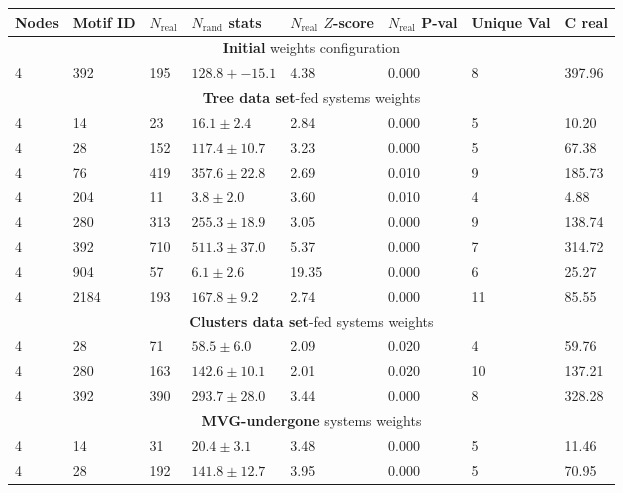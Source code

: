 \documentclass[a4paper,12pt]{article}
\begin{document}
\begin{table}[h!]
	\begin{center}
		\begin{tabular}{||p{1cm} | p{1cm} | p{1cm} | p{2.5cm} | p{1.5cm} | p{1.5cm} | p{1cm} | p{1.5cm}||}			
			\hline
			Nodes & Motif ID & $N_{\text{real}}$ & $N_{\text{rand}}$ stats & $N_{\text{real}}$ $Z$-score &  $N_{\text{real}}$ P-val & Unique Val & C real \\
			\hline \hline
			\multicolumn{8}{c}{\textbf{Initial} weights configuration} \\
			\hline
			4 & 392 & 195 & $ 128.8+-15.1 $ & 4.38  & 0.000 & 8 & 397.96 \\
			\hline \hline
			\multicolumn{8}{c}{\textbf{Tree data set}-fed systems weights} \\
			\hline
			4 & 14    & 23     & $  16.1\pm2.4      $ &  2.84  & 0.000  & 5  &  10.20   \\
			4 & 28    & 152    & $   117.4\pm10.7   $ &  3.23  & 0.000  & 5  &  67.38   \\
			4 & 76    & 419    & $   357.6\pm22.8   $ &  2.69  & 0.010  & 9  &  185.73  \\
			4 & 204   &  11    & $   3.8\pm2.0      $ &  3.60  & 0.010  & 4  &  4.88    \\
			4 & 280   &  313   & $     255.3\pm18.9 $ &  3.05  & 0.000  & 9  &  138.74  \\
			4 & 392   &  710   & $     511.3\pm37.0 $ &  5.37  & 0.000  & 7  &  314.72  \\
			4 & 904   &  57    & $     6.1\pm2.6    $ &  19.35 &  0.000 &  6 &   25.27  \\
			4 & 2184  &   193  & $     167.8\pm9.2  $ &  2.74  & 0.000  & 11 &   85.55  \\
			\hline \hline
			\multicolumn{8}{c}{\textbf{Clusters data set}-fed systems weights} \\
			\hline
			4 & 28   & 71   & $ 58.5\pm6.0     $ & 2.09 & 0.020 & 4  & 59.76  \\
			4 & 280  &  163 & $   142.6\pm10.1 $ & 2.01 & 0.020 & 10 & 137.21 \\
			4 & 392  &  390 & $   293.7\pm28.0 $ & 3.44 & 0.000 & 8  & 328.28 \\
			\hline \hline
			\multicolumn{8}{c}{\textbf{MVG-undergone} systems weights} \\
			\hline
			4 & 14    &   31     & $  20.4\pm3.1      $ &  3.48   &  0.000  &  5   &  11.46  \\
			4 & 28    &   192    & $   141.8\pm12.7   $ & 3.95    & 0.000   & 5    &  70.95  \\

\end{tabular}
\end{center}
\end{table}
\end{document}
